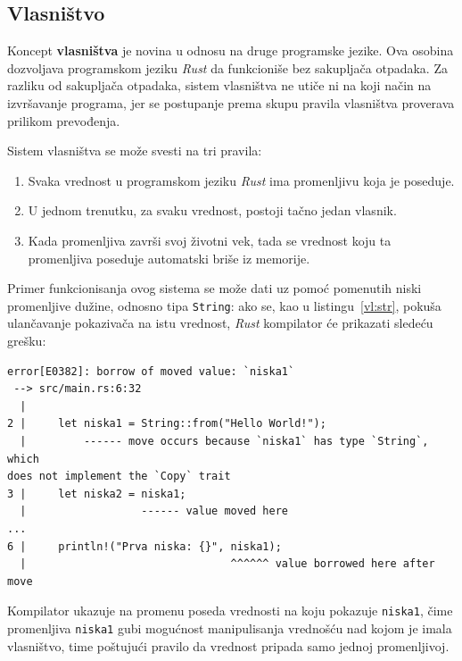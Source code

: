 \documentclass[12pt,oneside]{memoir}
\begin{document}




\subsection{Vlasništvo}
Koncept \textbf{vlasništva} je novina u odnosu na druge programske jezike. Ova
osobina dozvoljava programskom jeziku \emph{Rust} da funkcioniše bez sakupljača
otpadaka. Za razliku od sakupljača otpadaka, sistem vlasništva ne utiče ni na
koji način na izvršavanje programa, jer se postupanje prema skupu pravila
vlasništva proverava prilikom prevođenja.

Sistem vlasništva se može svesti na tri pravila:

\begin{enumerate}
  \item Svaka vrednost u programskom jeziku \emph{Rust} ima promenljivu koja
        je poseduje.
  \item U jednom trenutku, za svaku vrednost, postoji tačno jedan vlasnik.
  \item Kada promenljiva završi svoj životni vek, tada se vrednost
        koju ta promenljiva poseduje automatski briše iz memorije.
\end{enumerate}

Primer funkcionisanja ovog sistema se može dati uz pomoć pomenutih niski promenljive dužine,
odnosno tipa \texttt{String}: ako se, kao u listingu~\ref{vl:str}, pokuša
ulančavanje pokazivača na istu vrednost, \textit{Rust} kompilator će prikazati sledeću grešku:

\begin{lstlisting}[language={}, style=text]
error[E0382]: borrow of moved value: `niska1`
 --> src/main.rs:6:32
  |
2 |     let niska1 = String::from("Hello World!");
  |         ------ move occurs because `niska1` has type `String`, which
does not implement the `Copy` trait
3 |     let niska2 = niska1;
  |                  ------ value moved here
...
6 |     println!("Prva niska: {}", niska1);
  |                                ^^^^^^ value borrowed here after move
\end{lstlisting}

Kompilator ukazuje na promenu poseda vrednosti na koju pokazuje \texttt{niska1}, čime promenljiva
\texttt{niska1} gubi mogućnost manipulisanja vrednošću nad kojom je imala vlasništvo, time poštujući
pravilo da vrednost pripada samo jednoj promenljivoj.
\end{document}
